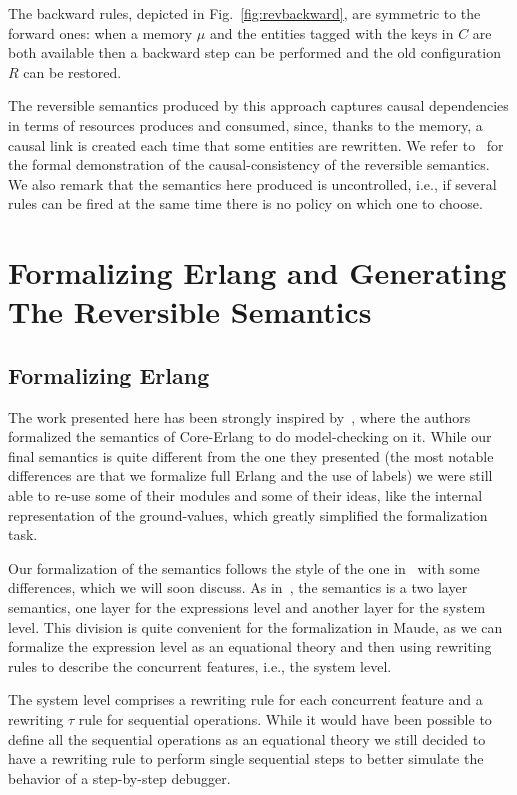 \documentclass{article}[12pt,a4paper]
\theoremstyle{definition}
\begin{document}
The backward rules, depicted in Fig.~\ref{fig:revbackward}, are symmetric to the
forward ones: when a memory $\mu$ and
the entities tagged with the keys in $C$ are both available then a backward step can be
performed and the old configuration $R$ can be restored.

The reversible semantics produced by this approach captures causal dependencies
in terms of resources produces and consumed, since, thanks to the memory, a
causal link is created each time that some entities are rewritten. We refer
to~\cite{LaneseM20} for the formal demonstration of the causal-consistency of
the reversible semantics. We also remark
that the semantics here produced is uncontrolled, i.e., if
several rules can be fired at the same time there is no policy on which one to choose.

\section{Formalizing Erlang and Generating The Reversible Semantics}\label{sec:contribution}

\subsection{Formalizing Erlang}\label{sec:formalizing-erlang}

The work presented here has been strongly inspired
by~\cite{NeuhauberN07}, where the authors formalized the semantics of
Core-Erlang to do model-checking on it. While our final semantics is quite
different from the one they presented (the most notable differences are that we formalize
full Erlang and the use of labels) we were still able to re-use some of their
modules and some of their ideas, like the internal representation of the
ground-values, which greatly simplified the formalization task.

Our formalization of the semantics follows the style of the one
in~\cite{Gonzalez-AbrilV21} with some differences, which we will soon discuss. As
in~\cite{Gonzalez-AbrilV21}, the semantics is a two
layer semantics, one layer for the expressions level and another layer for the system
level. This division is quite convenient for the formalization in Maude, as we
can formalize the expression level as an equational theory and then using rewriting
rules to describe the concurrent features, i.e., the system level.

The system level comprises a rewriting rule for each concurrent feature and a
rewriting $\tau$ rule for sequential operations. While it would have been
possible to
define all the sequential operations as an equational theory we still decided to
have a rewriting rule to perform single sequential steps to better simulate the
behavior of a step-by-step debugger.
\end{document}
